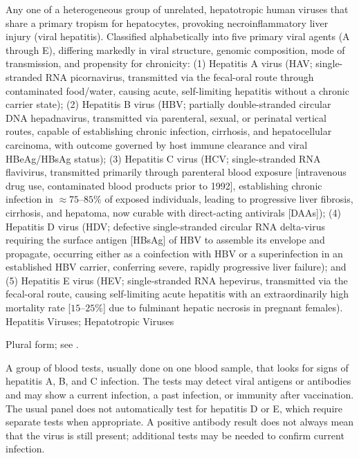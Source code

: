  Any one of a heterogeneous group of unrelated, hepatotropic human viruses that share a primary tropism for hepatocytes, provoking necroinflammatory liver injury (viral hepatitis). Classified alphabetically into five primary viral agents (A through E), differing markedly in viral structure, genomic composition, mode of transmission, and propensity for chronicity: (1) Hepatitis A virus (HAV; single-stranded RNA picornavirus, transmitted via the fecal-oral route through contaminated food/water, causing acute, self-limiting hepatitis without a chronic carrier state); (2) Hepatitis B virus (HBV; partially double-stranded circular DNA hepadnavirus, transmitted via parenteral, sexual, or perinatal vertical routes, capable of establishing chronic infection, cirrhosis, and hepatocellular carcinoma, with outcome governed by host immune clearance and viral HBeAg/HBsAg status); (3) Hepatitis C virus (HCV; single-stranded RNA flavivirus, transmitted primarily through parenteral blood exposure [intravenous drug use, contaminated blood products prior to 1992], establishing chronic infection in $\approx 75\text{--}85\%$ of exposed individuals, leading to progressive liver fibrosis, cirrhosis, and hepatoma, now curable with direct-acting antivirals [DAAs]); (4) Hepatitis D virus (HDV; defective single-stranded circular RNA delta-virus requiring the surface antigen [HBsAg] of HBV to assemble its envelope and propagate, occurring either as a coinfection with HBV or a superinfection in an established HBV carrier, conferring severe, rapidly progressive liver failure); and (5) Hepatitis E virus (HEV; single-stranded RNA hepevirus, transmitted via the fecal-oral route, causing self-limiting acute hepatitis with an extraordinarily high mortality rate [$15\text{--}25\%$] due to fulminant hepatic necrosis in pregnant females).
\synonyms
Hepatitis Viruses; Hepatotropic Viruses

 Plural form; see .

 A group of blood tests, usually done on one blood sample, that looks for signs of hepatitis A, B, and C infection. The tests may detect viral antigens or antibodies and may show a current infection, a past infection, or immunity after vaccination. The usual panel does not automatically test for hepatitis D or E, which require separate tests when appropriate. A positive antibody result does not always mean that the virus is still present; additional tests may be needed to confirm current infection.

